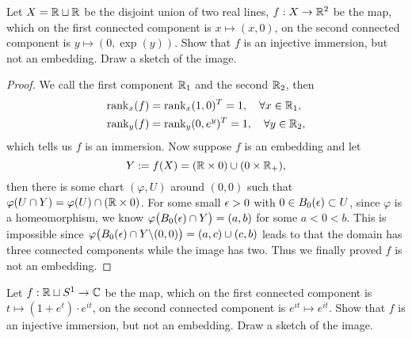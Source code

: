 \begin{pro}%
	Let $X=\mathbb{R}\sqcup \mathbb{R}$ be the disjoint union of two real lines, $f:X\to\mathbb{R}^2$ be the map, which on the first connected component is $x\mapsto (x,0)$, on the second connected component is $y\mapsto (0,\exp(y))$. Show that $f$ is an injective immersion, but not an embedding. Draw a sketch of the image.
\end{pro}
\begin{proof}
	We call the first component $\mathbb{R}_1$ and the second $\mathbb{R}_2$, then 
	\begin{align*}
		\mbox{rank}_x(f)&=\mbox{rank}_x(1,0)^T =1,\quad \forall x\in\mathbb{R}_1,\\
		\mbox{rank}_y(f)&=\mbox{rank}_y(0,e^y)^T =1,\quad \forall y\in\mathbb{R}_2,
	\end{align*}
	which tells us $f$ is an immersion. Now suppose $f$ is an embedding and let
	\[Y:=f(X)=(\mathbb{R}\times 0)\cup (0\times \mathbb{R}_+),\]
	then there is some chart $(\varphi,U)$ around $(0,0)$ such that
	$\varphi(U\cap Y)=\varphi(U)\cap (\mathbb{R}\times 0)$. For some small $\epsilon>0$ with $0\in B_0(\epsilon)\subset U$, since $\varphi$ is a homeomorphism, we know $\varphi\big(B_0(\epsilon)\cap Y\big)=(a,b)$ for some $a<0<b$. This is impossible since $\varphi\big(B_0(\epsilon)\cap Y\backslash (0,0)\big)=(a,c)\cup (c,b)$ leads to that the domain has three connected components while the image has two. Thus we finally proved $f$ is not an embedding.
\end{proof}
\begin{pro}%
	Let $f:\mathbb{R}\sqcup S^1 \to\mathbb{C}$ be the map, which on the first connected component is $t\mapsto (1+e^t)\cdot e^{it}$, on the second connected component is $e^{it}\mapsto e^{it}$. Show that $f$ is an injective immersion, but not an embedding. Draw a sketch of the image.
\end{pro}
